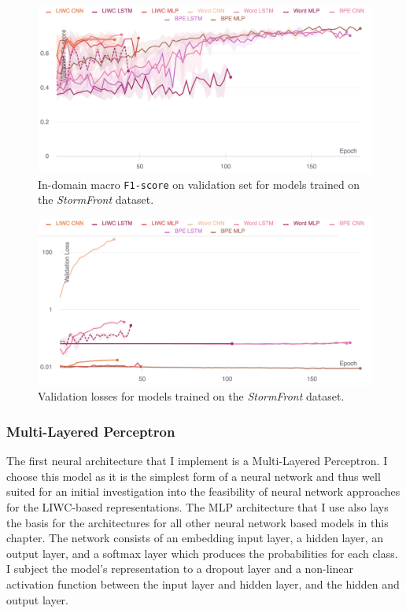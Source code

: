 \begin{figure}
    \centering
    \includegraphics[width=\textwidth]{garcia_dev_f1.pdf}
    \caption{In-domain macro \texttt{F1-score} on validation set for models trained on the \textit{StormFront} dataset.}
    \label{fig:garcia_dev_f1}
\end{figure}
\begin{figure}
    \centering
    \includegraphics[width=\textwidth]{garcia_dev_loss_stderr_logscale.pdf}
    \caption{Validation losses for models trained on the \textit{StormFront} dataset.}
    \label{fig:garcia_dev_loss}
\end{figure}

\subsubsection{Multi-Layered Perceptron}

The first neural architecture that I implement is a Multi-Layered Perceptron. I choose this model as it is the simplest form of a neural network and thus well suited for an initial investigation into the feasibility of neural network approaches for the LIWC-based representations. The MLP architecture that I use also lays the basis for the architectures for all other neural network based models in this chapter. The network consists of an embedding input layer, a hidden layer, an output layer, and a softmax layer which produces the probabilities for each class. I subject the model's representation to a dropout layer and a non-linear activation function between the input layer and hidden layer, and the hidden and output layer.

